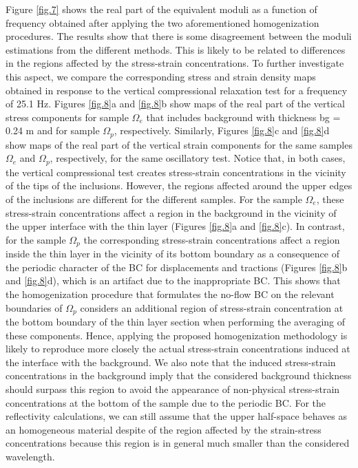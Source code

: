 \documentclass[draft]{agujournal2019}
\begin{document}
Figure \ref{fig.7} shows the real part of the  equivalent moduli as a function of frequency obtained after applying the two aforementioned homogenization procedures.
The results show that there is some disagreement between the moduli estimations from the different methods.
This is likely to be related to differences in the regions affected by the stress-strain concentrations. To further investigate this aspect, we compare the corresponding stress and strain density maps obtained in response to the vertical compressional relaxation test for a frequency of 25.1 Hz. Figures \ref{fig.8}a and \ref{fig.8}b show maps of the real part of the vertical stress components for sample $\Omega_e$ that includes background with thickness bg = 0.24 m and for  sample $\Omega_p$, respectively. Similarly, Figures \ref{fig.8}c and \ref{fig.8}d show maps of the real part of the vertical strain components for the same samples  $\Omega_e$ and $\Omega_p$, respectively, for the same oscillatory test. Notice that, in both cases, the vertical compressional test creates stress-strain concentrations in the vicinity of the tips of the inclusions. However, the regions affected around the upper edges of the inclusions are different for the different samples. For the sample $\Omega_e$, these stress-strain concentrations affect a region in the background in the vicinity of the upper interface with the thin layer (Figures \ref{fig.8}a and \ref{fig.8}c). In contrast, for the sample $\Omega_p$  the corresponding stress-strain concentrations affect a region inside the thin layer in the vicinity of its bottom boundary as a consequence of the periodic character of the BC for displacements and tractions (Figures \ref{fig.8}b and \ref{fig.8}d), which is an artifact due to the inappropriate BC. This shows that the homogenization procedure that formulates the no-flow BC on the relevant boundaries of $\Omega_p$ considers an additional region of stress-strain concentration at the bottom boundary of the thin layer section when performing the averaging of these components. Hence, applying the proposed homogenization methodology is likely to reproduce more closely the actual stress-strain concentrations induced at the interface with the background. We also note that the induced stress-strain concentrations in the background imply that the considered background thickness should surpass this region to avoid the appearance of non-physical stress-strain concentrations at the bottom of the sample due to the periodic BC. For the reflectivity calculations, we can still assume that the upper half-space behaves as an homogeneous material despite of the region affected by the strain-stress concentrations because this region is in general much smaller than the considered wavelength. 
\end{document}
